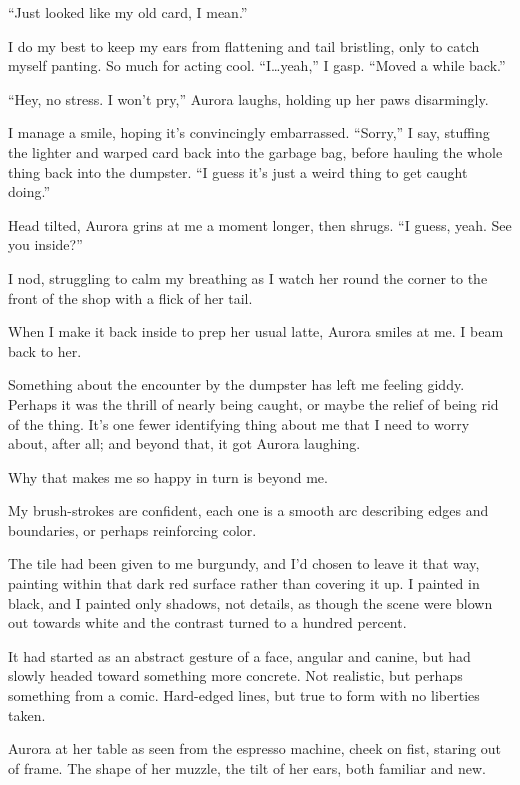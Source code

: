 ``Just looked like my old card, I mean.''

I do my best to keep my ears from flattening and tail bristling, only to catch myself panting. So much for acting cool. ``I\ldots{}yeah,'' I gasp. ``Moved a while back.''

``Hey, no stress. I won't pry,'' Aurora laughs, holding up her paws disarmingly.

I manage a smile, hoping it's convincingly embarrassed. ``Sorry,'' I say, stuffing the lighter and warped card back into the garbage bag, before hauling the whole thing back into the dumpster. ``I guess it's just a weird thing to get caught doing.''

Head tilted, Aurora grins at me a moment longer, then shrugs. ``I guess, yeah. See you inside?''

I nod, struggling to calm my breathing as I watch her round the corner to the front of the shop with a flick of her tail.

When I make it back inside to prep her usual latte, Aurora smiles at me. I beam back to her.

Something about the encounter by the dumpster has left me feeling giddy. Perhaps it was the thrill of nearly being caught, or maybe the relief of being rid of the thing. It's one fewer identifying thing about me that I need to worry about, after all; and beyond that, it got Aurora laughing.

Why that makes me so happy in turn is beyond me.

\secdiv{}

\noindent My brush-strokes are confident, each one is a smooth arc describing edges and boundaries, or perhaps reinforcing color.

The tile had been given to me burgundy, and I'd chosen to leave it that way, painting within that dark red surface rather than covering it up. I painted in black, and I painted only shadows, not details, as though the scene were blown out towards white and the contrast turned to a hundred percent.

It had started as an abstract gesture of a face, angular and canine, but had slowly headed toward something more concrete. Not realistic, but perhaps something from a comic. Hard-edged lines, but true to form with no liberties taken.

Aurora at her table as seen from the espresso machine, cheek on fist, staring out of frame. The shape of her muzzle, the tilt of her ears, both familiar and new.

